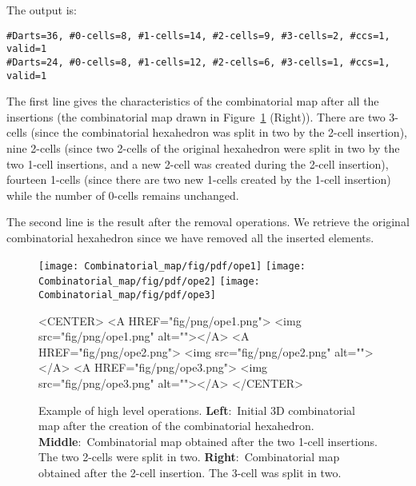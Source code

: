 
The output is:
\begin{verbatim}
#Darts=36, #0-cells=8, #1-cells=14, #2-cells=9, #3-cells=2, #ccs=1, valid=1
#Darts=24, #0-cells=8, #1-cells=12, #2-cells=6, #3-cells=1, #ccs=1, valid=1
\end{verbatim}

The first line gives the characteristics of the combinatorial map
after all the insertions (the combinatorial map drawn in
Figure~\ref{fig_exemple_ope} (Right)). There are two 3-cells (since
the combinatorial hexahedron was split in two by the 2-cell
insertion), nine 2-cells (since two 2-cells of the original hexahedron
were split in two by the two 1-cell insertions, and a new 2-cell was
created during the 2-cell insertion), fourteen 1-cells (since there
are two new 1-cells created by the 1-cell insertion) while the number
of 0-cells remains unchanged.

The second line is the result after the removal operations. We
retrieve the original combinatorial hexahedron since we have removed
all the inserted elements.

%
\def\largFig{.25\textwidth}%
\begin{figure}
  \begin{ccTexOnly}
    \begin{center}
      \texttt{[image: Combinatorial\_map/fig/pdf/ope1]}\qquad
      \texttt{[image: Combinatorial\_map/fig/pdf/ope2]}\qquad
      \texttt{[image: Combinatorial\_map/fig/pdf/ope3]}
    \end{center}
  \end{ccTexOnly}
  \begin{ccHtmlOnly}
    <CENTER>
    <A HREF="fig/png/ope1.png"> <img src="fig/png/ope1.png" alt=""></A>
    <A HREF="fig/png/ope2.png"> <img src="fig/png/ope2.png" alt=""></A>
    <A HREF="fig/png/ope3.png"> <img src="fig/png/ope3.png" alt=""></A>
    </CENTER>
    \end{ccHtmlOnly}  
      \caption{Example of high level operations.  
        \textbf{Left}:~Initial 3D combinatorial map after the 
        creation of the combinatorial hexahedron.
        \textbf{Middle}:~Combinatorial map obtained after
        the two 1-cell insertions. The two 2-cells were split in two.
        \textbf{Right}:~Combinatorial map obtained after the 2-cell 
        insertion. The 3-cell was split in two.}
    \label{fig_exemple_ope}
\end{figure}


